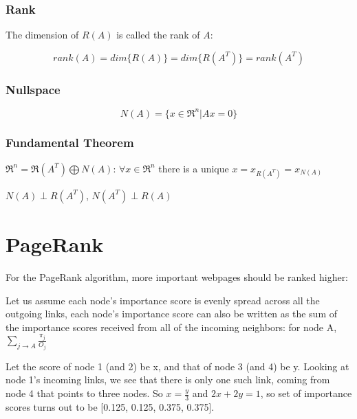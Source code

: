 \subsubsection{Rank}

The dimension of $R(A)$ is called the rank of $A$:

\begin{equation*}
rank(A) = dim\{R(A)\} = dim\{R(A^T)\} = rank(A^T)
\end{equation*}

\subsubsection{Nullspace} 

\begin{equation*}
N(A) = \{x\in \Re^n | Ax = 0\}
\end{equation*}

\subsubsection{Fundamental Theorem}
$\Re^n = \Re(A^T) \bigoplus N(A)$: $\forall x\in \Re^n$ there is a unique $x = x_{R(A^T)} = x_{N(A)}$ 

$N(A) \perp R(A^T)$, $N(A^T) \perp R(A)$


\section{PageRank}


For the PageRank algorithm, more important webpages should be ranked higher:


Let us assume each node's importance score is evenly spread across all the outgoing links, each node’s importance score can also be written as the sum of the importance scores received from all of the incoming neighbors: for node A, $\sum_{j \rightarrow A}\frac{\pi_j}{O_j}$

\begin{figure}
	\centering
	\resizebox{7.5cm}{3cm}{}
	\caption{}
	\label{}
\end{figure}


Let the score of node 1 (and 2) be x, and that of node 3 (and 4) be y. Looking at node 1’s incoming links, we see that there is only one such link, coming from node 4 that points to three nodes. So $x = \frac{y}{3}$ and $2x + 2y = 1$, so set of importance scores turns out to be [0.125, 0.125, 0.375, 0.375].

